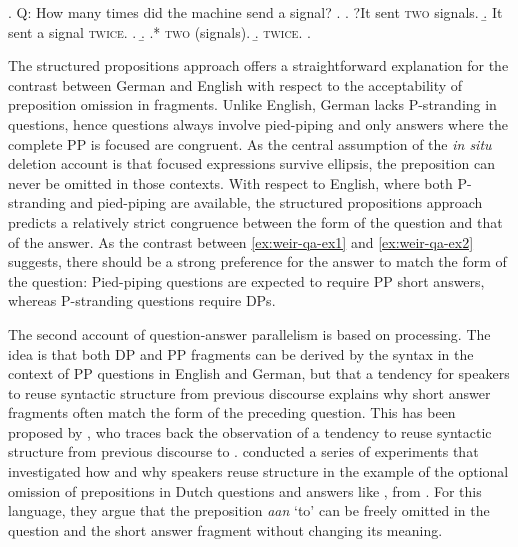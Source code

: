 \ex. \label{ex:weir-qa-ex2}
Q: How many times did the machine send a signal? \hfill \citep[1289]{weir2018}
\a. \a. ?It sent \textsc{two} signals.
    \b. It sent a signal \textsc{twice}.
    \z.
\b.
\a.* \textsc{two} (signals).
\b. \textsc{twice}.
\z.

The structured propositions approach offers a straightforward explanation for the contrast between German and English with respect to the acceptability of preposition omission in fragments. Unlike English, German lacks P-stranding in questions, hence questions always involve pied-piping and only answers where the complete PP is focused are congruent. As the central assumption of the \textit{in situ} deletion account is that focused expressions survive ellipsis, the preposition can never be omitted in those contexts. With respect to English, where both P-stranding and pied-piping are available, the structured propositions approach predicts a relatively strict congruence between the form of the question and that of the answer. As the contrast between \ref{ex:weir-qa-ex1} and \ref{ex:weir-qa-ex2} suggests, there should be a strong preference for the answer to match the form of the question: Pied-piping questions are expected to require PP short answers, whereas P-stranding questions require DPs.
\newpage

The second account of question-answer parallelism is based on processing. The idea is that both DP and PP fragments can be derived by the syntax in the context of PP questions in English and German, but that a tendency for speakers to reuse syntactic structure from previous discourse explains why short answer fragments often match the form of the preceding question. This has been proposed by \citet{nykiel2017}, who traces back the observation of a tendency to reuse syntactic structure from previous discourse to \citet{levelt.kelter1982}. \citet{levelt.kelter1982} conducted a series of experiments that investigated how and why speakers reuse structure in the example of the optional omission of prepositions in Dutch questions and answers like \Next, from \citet[80]{levelt.kelter1982}. For this language, they argue that the preposition \textit{aan} `to' can be freely omitted in the question and the short answer fragment without changing its meaning.

